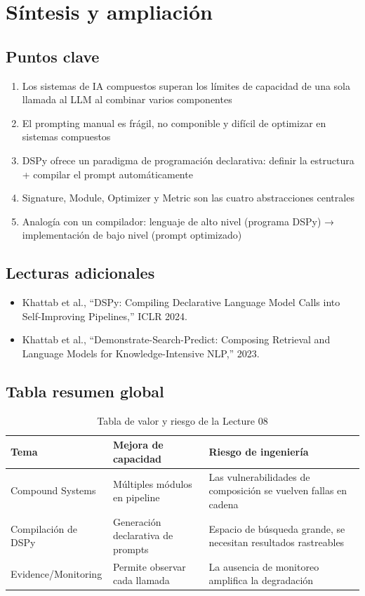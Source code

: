 \section{Síntesis y ampliación}

\subsection{Puntos clave}

\begin{enumerate}
    \item Los sistemas de IA compuestos superan los límites de capacidad de una sola llamada al LLM al combinar varios componentes
    \item El prompting manual es frágil, no componible y difícil de optimizar en sistemas compuestos
    \item DSPy ofrece un paradigma de programación declarativa: definir la estructura + compilar el prompt automáticamente
    \item Signature, Module, Optimizer y Metric son las cuatro abstracciones centrales
    \item Analogía con un compilador: lenguaje de alto nivel (programa DSPy) → implementación de bajo nivel (prompt optimizado)
\end{enumerate}

\subsection{Lecturas adicionales}

\begin{itemize}
    \item Khattab et al., ``DSPy: Compiling Declarative Language Model Calls into Self-Improving Pipelines,'' ICLR 2024.
    \item Khattab et al., ``Demonstrate-Search-Predict: Composing Retrieval and Language Models for Knowledge-Intensive NLP,'' 2023.
\end{itemize}

\subsection{Tabla resumen global}

\begin{table}[H]
\centering
\begin{tabular}{p{}p{}p{}}
\toprule
Tema & Mejora de capacidad & Riesgo de ingeniería \\
\midrule
Compound Systems & Múltiples módulos en pipeline & Las vulnerabilidades de composición se vuelven fallas en cadena \\
Compilación de DSPy & Generación declarativa de prompts & Espacio de búsqueda grande, se necesitan resultados rastreables \\
Evidence/Monitoring & Permite observar cada llamada & La ausencia de monitoreo amplifica la degradación \\
\bottomrule
\end{tabular}
\caption{Tabla de valor y riesgo de la Lecture 08}
\end{table}

